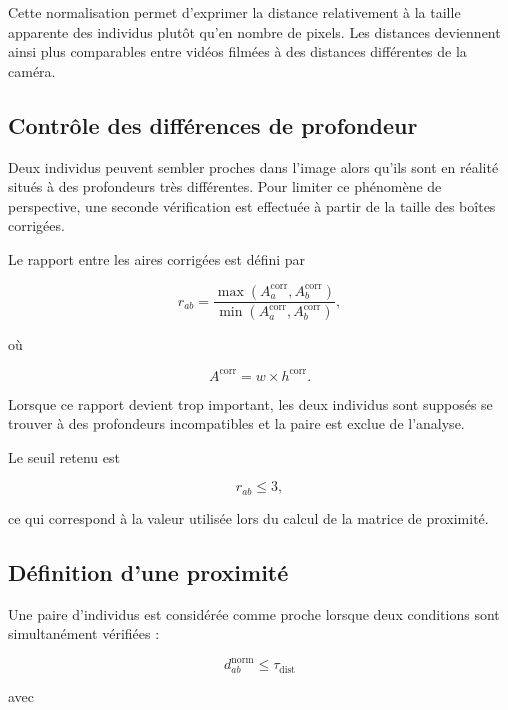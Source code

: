 \documentclass[11pt,a4paper]{report}
\begin{document}
Cette normalisation permet d'exprimer la distance relativement à la taille
apparente des individus plutôt qu'en nombre de pixels. Les distances deviennent
ainsi plus comparables entre vidéos filmées à des distances différentes de la
caméra.

\subsection*{Contrôle des différences de profondeur}

Deux individus peuvent sembler proches dans l'image alors qu'ils sont en réalité
situés à des profondeurs très différentes. Pour limiter ce phénomène de
perspective, une seconde vérification est effectuée à partir de la taille des
boîtes corrigées.

Le rapport entre les aires corrigées est défini par

\begin{equation}
r_{ab}
=
\frac{
\max\left(A_a^{\mathrm{corr}},
A_b^{\mathrm{corr}}\right)}
{
\min\left(A_a^{\mathrm{corr}},
A_b^{\mathrm{corr}}\right)},
\end{equation}

où

\begin{equation}
A^{\mathrm{corr}}
=
w\times h^{\mathrm{corr}}.
\end{equation}

Lorsque ce rapport devient trop important, les deux individus sont supposés se
trouver à des profondeurs incompatibles et la paire est exclue de l'analyse.

Le seuil retenu est

\begin{equation}
r_{ab}\leq3,
\end{equation}

ce qui correspond à la valeur utilisée lors du calcul de la matrice de proximité. 

\subsection*{Définition d'une proximité}

Une paire d'individus est considérée comme proche lorsque deux conditions sont
simultanément vérifiées :

\begin{equation}
d_{ab}^{\mathrm{norm}}
\leq
\tau_{\mathrm{dist}}
\end{equation}

avec
\end{document}
